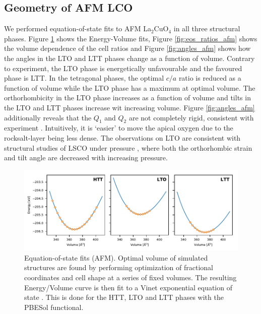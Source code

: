\subsection{Geometry of AFM LCO}
We performed equation-of-state fits to AFM La$_2$CuO$_4$ in all three structural phases. Figure \ref{fig:eos_afm_all} shows the Energy-Volume fits, Figure \ref{fig:eos_ratios_afm} shows the volume dependence of the cell ratios and Figure \ref{fig:angles_afm} shows how the angles in the LTO and LTT phases change as a function of volume. Contrary to experiment, the LTO phase is energetically unfavourable and the favoured phase is LTT. In the tetragonal phases, the optimal $c/a$ ratio is reduced as a function of volume while the LTO phase has a maximum at optimal volume. The orthorhombicity in the LTO phase increases as a function of volume and tilts in the LTO and LTT phases increase wit increasing volume. Figure \ref{fig:angles_afm} additionally reveals that the $Q_1$ and $Q_2$ are not completely rigid, consistent with experiment \cite{Radaelli1994a}. Intuitively, it is `easier' to move the apical oxygen due to the rocksalt-layer being less dense. The observations on LTO are consistent with structural studies of LSCO under pressure \cite{Takahashi1994}, where both the orthorhombic strain and tilt angle are decreased with increasing pressure.

\begin{figure}
    \centering
    \includegraphics[width=\textwidth]{fig/simulation/eos_all.pdf}
    \caption[AFM: Equation-of-state fits]{Equation-of-state fits (AFM). Optimal volume of simulated structures are found by performing optimization of fractional coordinates and cell shape at a series of fixed volumes. The resulting Energy/Volume curve is then fit to a Vinet exponential equation of state \cite{Vinet1987}. This is done for the HTT, LTO and LTT phases with the PBESol functional.}
    \label{fig:eos_afm_all}
\end{figure}

